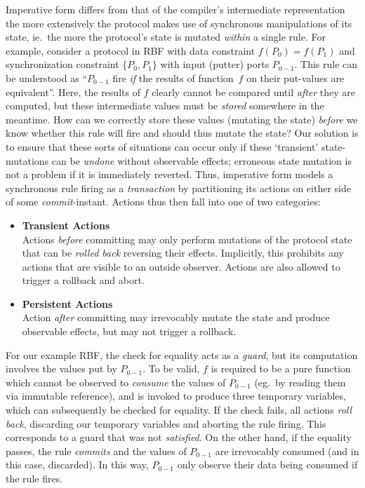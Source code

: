Imperative form differs from that of the compiler's intermediate representation the more extensively the protocol makes use of synchronous manipulations of its state, ie.\ the more the protocol's state is mutated \textit{within} a single rule. For example, consider a protocol in RBF with data constraint $f(P_0)=f(P_1)$ and synchronization constraint $\{P_0, P_1\}$ with input (putter) ports $P_{0-1}$. This rule can be understood as ``$P_{0-1}$ fire \textit{if} the results of function~$f$ on their put-values are equivalent''. Here, the results of $f$ clearly cannot be compared until \textit{after} they are computed, but these intermediate values must be \textit{stored} somewhere in the meantime. How can we correctly store these values (mutating the state) \textit{before} we know whether this rule will fire and should thus mutate the state? Our solution is to ensure that these sorts of situations can occur only if these `transient' state-mutations can be \textit{undone} without observable effects; erroneous state mutation is not a problem if it is immediately reverted. Thus, imperative form models a synchronous rule firing as a \textit{transaction} by partitioning its actions on either side of some \textit{commit}-instant. Actions thus then fall into one of two categories:
\begin{itemize}
	\item \textbf{Transient Actions}\\
	Actions \textit{before} committing may only perform mutations of the protocol state that can be \textit{rolled back} reversing their effects. Implicitly, this prohibits any actions that are visible to an outside observer. Actions are also allowed to trigger a rollback and abort.
	
	\item \textbf{Persistent Actions}\\
	Action \textit{after} committing may irrevocably mutate the state and produce observable effects, but may not trigger a rollback.
\end{itemize}

For our example RBF, the check for equality acts as a \textit{guard}, but its computation involves the values put by $P_{0-1}$. To be valid, $f$ is required to be a pure function which cannot be observed to \textit{consume} the values of $P_{0-1}$ (eg.\ by reading them via immutable reference), and is invoked to produce three temporary variables, which can subsequently be checked for equality. If the check fails, all actions \textit{roll back}, discarding our temporary variables and aborting the rule firing. This corresponds to a guard that was not \textit{satisfied}. On the other hand, if the equality passes, the rule \textit{commits} and the values of $P_{0-1}$ are irrevocably consumed (and in this case, discarded). In this way, $P_{0-1}$ only observe their data being consumed if the rule fires.

